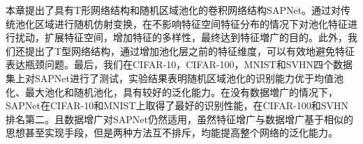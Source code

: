 本章提出了具有T形网络结构和随机区域池化的卷积网络结构SAPNet。通过对传统池化区域进行随机仿射变换，在不影响特征空间特征分布的情况下对池化特征进行扰动，扩展特征空间，增加特征的多样性，最终达到特征増广的目的。此外，我们还提出了T型网络结构，通过增加池化层之前的特征维度，可以有效地避免特征表达瓶颈问题。最后，我们在CIFAR-10，CIFAR-100，MNIST和SVHN四个数据集上对SAPNet进行了测试，实验结果表明随机区域池化的识别能力优于均值池化、最大池化和随机池化，具有较好的泛化能力。在没有数据増广的情况下，SAPNet在CIFAR-10和MNIST上取得了最好的识别性能，在CIFAR-100和SVHN排名第二。且数据增广对SAPNet仍然适用，虽然特征增广与数据增广基于相似的思想甚至实现手段，但是两种方法互不排斥，均能提高整个网络的泛化能力。














